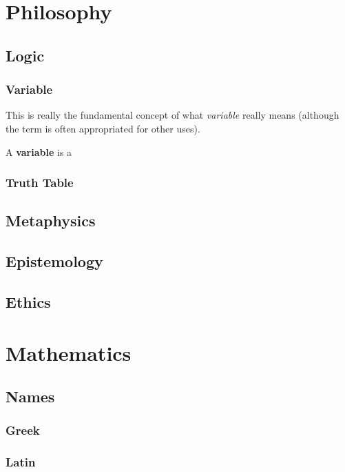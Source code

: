 \documentclass{article}
\newcommand{\definition}[1]{
	\vspace{10px}
	\noindent {[\sc Definition]} #1
	\vspace{10px}
}
\begin{document}
\section{Philosophy}

\subsection{Logic}
\subsubsection{Variable}
	This is really the fundamental concept of what \textit{variable} really means (although the term is often appropriated for other uses).
	
	\definition{A \textbf{variable} is a }

\subsubsection{Truth Table}

\subsection{Metaphysics}

\subsection{Epistemology}

\subsection{Ethics}


\newpage
\section{Mathematics}

\subsection{Names}

\subsubsection{Greek}
\subsubsection{Latin}
\end{document}
